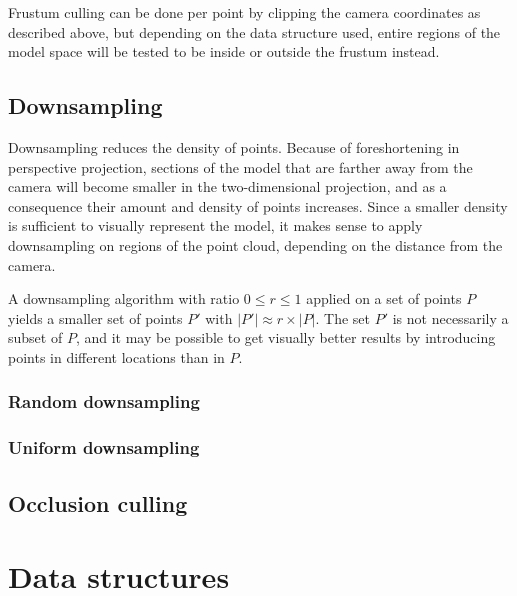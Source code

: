 \documentclass[a4paper,11pt,abstracton,notitlepage]{scrreprt}
\begin{document}
Frustum culling can be done per point by clipping the camera coordinates as described above, but depending on the data structure used, entire regions of the model space will be tested to be inside or outside the frustum instead.


\section{Downsampling}
Downsampling reduces the density of points. Because of foreshortening in perspective projection, sections of the model that are farther away from the camera will become smaller in the two-dimensional projection, and as a consequence their amount and density of points increases. Since a smaller density is sufficient to visually represent the model, it makes sense to apply downsampling on regions of the point cloud, depending on the distance from the camera.

A downsampling algorithm with ratio $0 \leq r \leq 1$ applied on a set of points $P$ yields a smaller set of points $P'$ with $|P'| \approx r \times |P|$. The set $P'$ is not necessarily a subset of $P$, and it may be possible to get visually better results by introducing points in different locations than in $P$.



\subsection{Random downsampling}
\subsection{Uniform downsampling}

\section{Occlusion culling}


\chapter{Data structures}



\end{document}
